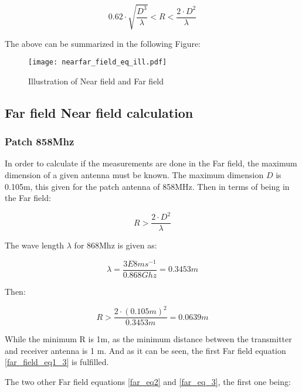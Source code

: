 \begin{equation}
0.62 \cdot \sqrt{\frac{D^{3}}{\lambda}} < R < \frac{2 \cdot D^{2}}{\lambda}
\label{far_field_eq1_2}
\end{equation}


The above can be summarized in the following Figure:

\begin{figure}[H]
\centering
\texttt{[image: nearfar\_field\_eq\_ill.pdf]}
\caption{Illustration of Near field and Far field \citep{farnear_field1}}
\label{nearfarf_eq_ill}
\end{figure}


\subsection{Far field Near field calculation}

\subsubsection{Patch 858Mhz}

In order to calculate if the measurements are done in the Far field, the maximum dimension of a given antenna must be known. The maximum dimension $D$ is 0.105m, this given for the patch antenna of 858MHz. Then in terms of being in the Far field:

\begin{equation}
R > \frac{2 \cdot D^{2}}{\lambda}
\label{far_field_eq1_3}
\end{equation}



The wave length $\lambda$ for 868Mhz is given as:

\begin{equation}
\lambda = \frac{3E8 ms^{-1}}{0.868 Ghz} = 0.3453m
\end{equation}

Then:

\begin{equation}
R> \frac{2 \cdot (0.105m)^{2}}{0.3453m} = 0.0639 m 
\end{equation} 

While the minimum R is 1m, as the minimum distance between the transmitter and receiver antenna is 1 m. And as it can be seen, the first Far field equation \ref{far_field_eq1_3} is fulfilled. 

The two other Far field equations \ref{far_eq2} and \ref{far_eq_3}, the first one being:


